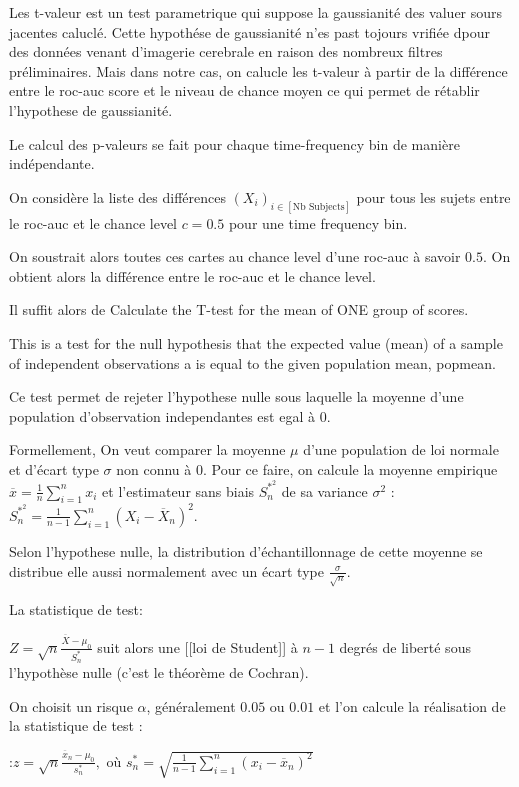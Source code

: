 Les t-valeur est un test parametrique qui suppose la gaussianité des valuer sours jacentes caluclé. Cette hypothése de gaussianité n'es past tojours vrifiée dpour des données venant d'imagerie cerebrale en raison des nombreux filtres préliminaires. Mais dans notre cas, on calucle les t-valeur à partir de la différence entre le roc-auc score et le niveau de chance moyen ce qui permet de rétablir l'hypothese de gaussianité.

Le calcul des p-valeurs se fait pour chaque time-frequency bin de manière indépendante.

On considère la liste des différences $(X_i)_{i \in [\text{Nb Subjects}]}$ pour tous les sujets entre le roc-auc et le chance level $c=0.5$ pour une time frequency bin.

On soustrait alors toutes ces cartes au chance level d'une roc-auc à savoir $0.5$. On obtient alors la différence entre le roc-auc et le chance level.

Il suffit alors de Calculate the T-test for the mean of ONE group of scores.

This is a test for the null hypothesis that the expected value (mean) of a sample of independent observations a is equal to the given population mean, popmean.

Ce test permet de rejeter l'hypothese nulle sous laquelle la moyenne d'une population d'observation independantes est egal à $0$.

Formellement,
On veut comparer la moyenne $\mu$ d'une population de loi normale et d’écart type $\sigma$ non connu à $0$. Pour ce faire, on calcule la moyenne empirique $\overline{x} = \frac{1}{n}\sum_{i=1}^{n}x_i$ et l'estimateur  sans biais $S^{\ast ^2}_n$ de sa variance $\sigma^2$
:$S^{\ast ^2}_n = \frac{1}{n-1}\sum\limits_{i=1}^n (X_i - \overline X_n )^2$.

Selon l’hypothese nulle, la distribution d’échantillonnage de cette moyenne se distribue elle aussi normalement avec un écart type $\frac{\sigma}{\sqrt{n}}$.

La statistique de test:

$ Z = \sqrt{n}\frac{\overline{X} - \mu_0}{S^{\ast}_n}$
suit alors une [[loi de Student]] à $n-1$ degrés de liberté sous l'hypothèse nulle (c'est le théorème de Cochran).

On choisit un risque $\alpha$, généralement $0.05$ ou $0.01$ et l'on calcule la réalisation de la statistique de test :

:$z = \sqrt{n}\frac{\overline{x}_n - \mu_0}{s^{\ast}_n},$ où $s^{\ast}_n =\sqrt{\frac{1}{n-1}\sum\limits_{i=1}^n (x_i - \overline x_n )^2} $


